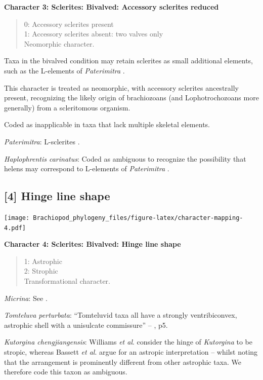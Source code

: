 \documentclass[openany]{book}
\theoremstyle{definition}
\theoremstyle{definition}
\theoremstyle{definition}
\theoremstyle{remark}
\begin{document}
\textbf{Character 3: Sclerites: Bivalved: Accessory sclerites reduced}

\begin{quote}
0: Accessory sclerites present\\
1: Accessory sclerites absent: two valves only\\
Neomorphic character.
\end{quote}

Taxa in the bivalved condition may retain sclerites as small additional
elements, such as the L-elements of \emph{Paterimitra}
\citep{Skovsted2015Theearly}.

This character is treated as neomorphic, with accessory sclerites
ancestrally present, recognizing the likely origin of brachiozoans (and
Lophotrochozoans more generally) from a scleritomous organism.

Coded as inapplicable in taxa that lack multiple skeletal elements.

\emph{Paterimitra}: L-sclerites \citep{Skovsted2009Thescleritome}.

\emph{Haplophrentis carinatus}: Coded as ambiguous to recognize the
possibility that helens may correspond to L-elements of
\emph{Paterimitra} \citep{Moysiuk2017Hyolithsare}.

\hypertarget{hinge-line-shape}{%
\subsection*{{[}4{]} Hinge line shape}\label{hinge-line-shape}}

\texttt{[image: Brachiopod\_phylogeny\_files/figure-latex/character-mapping-4.pdf]}

\textbf{Character 4: Sclerites: Bivalved: Hinge line shape}

\begin{quote}
1: Astrophic\\
2: Strophic\\
Transformational character.
\end{quote}

\emph{Micrina}: See \citet{Holmer2008TheEarly}.

\emph{Tomteluva perturbata}: ``Tomteluvid taxa all have a strongly
ventribiconvex, astrophic shell with a unisulcate commissure'' --
\citet{Streng2016Anew}, p5.

\emph{Kutorgina chengjiangensis}: Williams \emph{et al}.
\citeyearpar[p.~208]{Williams2000BrachiopodaLinguliformea} consider the
hinge of \emph{Kutorgina} to be stropic, whereas Bassett \emph{et al}.
\citeyearpar{Bassett2001Functionalmorphology} argue for an astropic
interpretation -- whilst noting that the arrangement is prominently
different from other astrophic taxa. We therefore code this taxon as
ambiguous.
\end{document}
